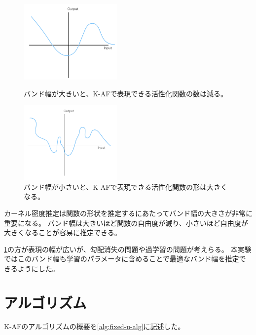 \begin{figure}[hbtp]
    \begin{center}
            \begin{minipage}{0.40\hsize}
                \includegraphics[width=5cm]{asset/k_af_band_big.png}
                    \caption{バンド幅が大きいと、K-AFで表現できる活性化関数の数は減る。}
                    \label{k_af_band_big}
            \end{minipage}
            \begin{minipage}{0.40\hsize}
            \hspace{10pt}
                \includegraphics[width=5cm]{asset/k_af_band_small.png}
                    \caption{バンド幅が小さいと、K-AFで表現できる活性化関数の形は大きくなる。}
                    \label{k_af_band_small}
            \end{minipage}
    \end{center}
\end{figure}


カーネル密度推定は関数の形状を推定するにあたってバンド幅の大きさが非常に重要になる。
バンド幅は大きいほど関数の自由度が減り、小さいほど自由度が大きくなることが容易に推定できる。

\ref{k_af_band_small}の方が表現の幅が広いが、勾配消失の問題や過学習の問題が考えらる。
本実験ではこのバンド幅も学習のパラメータに含めることで最適なバンド幅を推定できるようにした。

\section{アルゴリズム}
\label{al}
K-AFのアルゴリズムの概要を\ref{alg:fixed-u-alg}に記述した。

